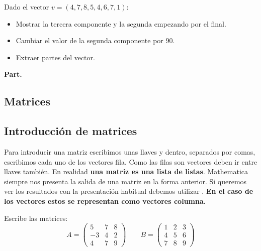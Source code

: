 \documentclass[a4paper,10pt, draft]{article}
\newcommand{\com}[1]{\textbf{\color{blue}{#1}}}
\newenvironment{capitulo}{\begin{tcolorbox}[colback=red!5!white,colframe=red!75!black]}{\end{tcolorbox}\bigskip}
\newenvironment{ejer}{\begin{tcolorbox}[center title, title=Ejercicios,
fonttitle=\sffamily\bfseries,colback=blue!5,colframe=orange]}{\end{tcolorbox}}
\newenvironment{funciones}{\begin{tcolorbox}[center title, title=Nuevas funciones, fonttitle=\sffamily\bfseries, colback=green!5!white,colframe=red!75!black]}{\end{tcolorbox}\bigskip}
\begin{document}
\begin{ejer}

Dado el vector $v=(4,7,8,5,4,6,7,1)$:

\begin{itemize}

\item Mostrar la tercera componente y la segunda empezando por el final.

\item Cambiar el valor de la segunda componente por $90$.

\item Extraer partes del vector.

\end{itemize}


\end{ejer} 


\begin{funciones}

\textbf{Part.}

\end{funciones}

\newpage

\begin{capitulo}

\section{Matrices}

\end{capitulo}

\subsection{Introducción de matrices}

Para introducir una matriz escribimos unas llaves y dentro, separados por comas, escribimos cada uno de los vectores fila. Como las filas son vectores  deben ir entre llaves también. En realidad \textbf{una matriz es una lista de listas}. Mathematica siempre nos presenta la salida de una matriz en la forma anterior. Si queremos ver los resultados con la presentación habitual debemos utilizar \com{MatrixForm[A]}. \textbf{En el caso de los vectores estos se representan como vectores columna.}



\begin{ejer}

Escribe las matrices:
$$
A=\begin{pmatrix}
5 &7 & 8\\
-3 & 4 & 2 \\
4 & 7 & 9
\end{pmatrix}
\qquad 
B=\begin{pmatrix}
1 &2 & 3\\
4 & 5 & 6 \\
7 & 8 & 9
\end{pmatrix}
$$

\end{ejer} 
\end{document}

